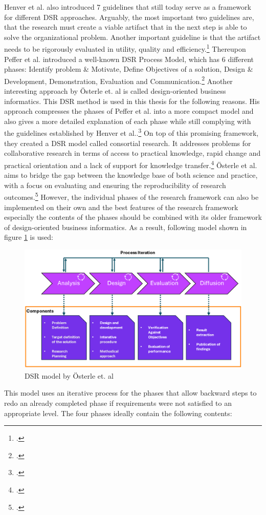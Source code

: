 Henver et al. also introduced 7 guidelines that still today serve as a framework for different \ac{DSR} approaches.
Arguably, the most important two guidelines are, that the research must create a viable artifact that in the next step is able to solve the organizational problem. 
Another important guideline is that the artifact needs to be rigorously evaluated in utility, quality and efficiency.\footcite[83]{hevnerDesignScienceInformation2004a}
Thereupon Peffer et al. introduced a well-known \ac{DSR} Process Model, which has 6 different phases: Identify problem \& Motivate, Define Objectives of a solution, 
Design \& Development, Demonstration, Evaluation and Communication.\footcite[cf.][54]{peffersDesignScienceResearch2007a}
Another interesting approach by Österle et. al is called design-oriented business informatics. 
This \ac{DSR} method is used in this thesis for the following reasons.
His approach compresses the phases of Peffer et al. into a more compact model and also gives a more detailed explanation of each phase while still complying with the guidelines established by Henver et al..\footcite[cf.][1-6]{oesterleMemorandumZurGestaltungsorientierten2010}
On top of this promising framework, they created a \ac{DSR} model called consortial research.
It addresses problems for collaborative research in terms of access to practical knowledge, rapid change and practical orientation and a lack of support for knowledge transfer.\footcite[cf.][273-274]{oesterleKonsortialforschung2010}
Österle et al. aims to bridge the gap between the knowledge base of both science and practice, with a focus on evaluating and ensuring the reproducibility of research outcomes.\footcite[cf.][5]{oesterleMemorandumZurGestaltungsorientierten2010}
However, the individual phases of the research framework can also be implemented on their own and the best features 
of the research framework especially the contents of the phases should be combined with its older framework of design-oriented business informatics.
As a result, following model shown in figure \ref{DSR_Modell} is used:
\begin{figure}[H]
    \centering
    \includegraphics[width=0.9\linewidth]{graphics/DSR_Modell.png}
    \caption{DSR model by Österle et. al\protect\footnotemark}
    \label{DSR_Modell}
\end{figure}
This model uses an iterative process for the phases that allow backward steps to redo an already completed phase if requirements were not satisfied to an appropriate level.
The four phases ideally contain the following contents:

